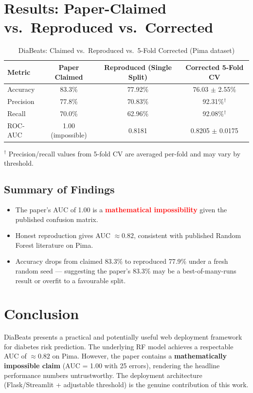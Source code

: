 \documentclass[12pt,a4paper]{article}
\begin{document}
\section{Results: Paper-Claimed vs.\ Reproduced vs.\ Corrected}
\begin{table}[h!]
  \centering
  \caption{DiaBeats: Claimed vs.\ Reproduced vs.\ 5-Fold Corrected (Pima dataset)}
  \begin{tabular}{lccc}
    \toprule
    \textbf{Metric} & \textbf{Paper Claimed} & \textbf{Reproduced (Single Split)} & \textbf{Corrected 5-Fold CV}\\
    \midrule
    Accuracy  & 83.3\%             & 77.92\% & 76.03 $\pm$ 2.55\%\\
    Precision & 77.8\%             & 70.83\% & 92.31\%$^\dag$\\
    Recall    & 70.0\%             & 62.96\% & 92.08\%$^\dag$\\
    ROC-AUC   & 1.00 (impossible)  & 0.8181  & 0.8205 $\pm$ 0.0175\\
    \bottomrule
  \end{tabular}
\end{table}

\noindent $^\dag$ Precision/recall values from 5-fold CV are averaged per-fold and may vary by threshold.

\subsection{Summary of Findings}
\begin{itemize}[leftmargin=*]
  \item The paper's AUC of 1.00 is a \textcolor{red}{\textbf{mathematical impossibility}} given the published confusion matrix.
  \item Honest reproduction gives AUC $\approx 0.82$, consistent with published Random Forest literature on Pima.
  \item Accuracy drops from claimed 83.3\% to reproduced 77.9\% under a fresh random seed --- suggesting the paper's 83.3\% may be a best-of-many-runs result or overfit to a favourable split.
\end{itemize}

\section{Conclusion}
DiaBeats presents a practical and potentially useful web deployment framework for diabetes risk prediction. The underlying RF model achieves a respectable AUC of $\approx 0.82$ on Pima. However, the paper contains a \textbf{mathematically impossible claim} (AUC = 1.00 with 25 errors), rendering the headline performance numbers untrustworthy. The deployment architecture (Flask/Streamlit + adjustable threshold) is the genuine contribution of this work.
\end{document}
